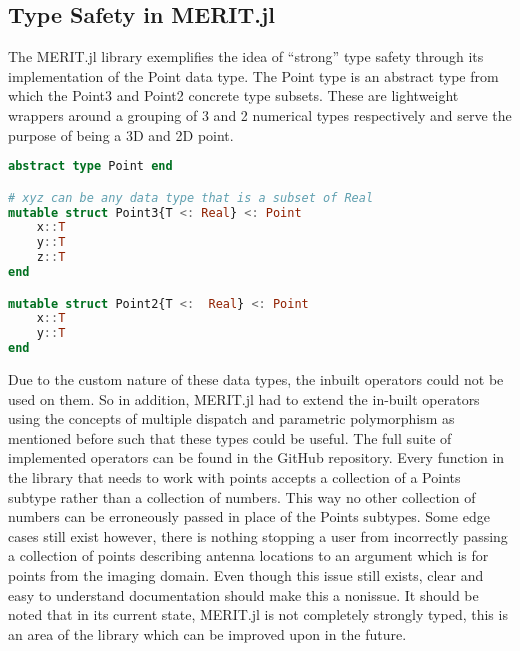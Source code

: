 \subsection{Type Safety in MERIT.jl}
The MERIT.jl library exemplifies the idea of ``strong'' type safety through its implementation of the Point data type.
The Point type is an abstract type from which the Point3 and Point2 concrete type subsets. These are lightweight
wrappers around a grouping of 3 and 2 numerical types respectively and serve the purpose of being a 3D and 2D point.
\begin{lstlisting}[language=Julia]
abstract type Point end

# xyz can be any data type that is a subset of Real
mutable struct Point3{T <: Real} <: Point
    x::T
    y::T
    z::T 
end

mutable struct Point2{T <:  Real} <: Point
    x::T
    y::T
end
\end{lstlisting}
Due to the custom nature of these data types, the inbuilt operators could not be used on them. So in addition, MERIT.jl
had to extend the in-built operators using the concepts of multiple dispatch and parametric polymorphism as mentioned
before such that these types could be useful. The full suite of implemented operators can be found in the GitHub
repository. Every function in the library that needs to work with points accepts a collection of a Points subtype
rather than a collection of numbers. This way no other collection of numbers can be erroneously passed in place of the
Points subtypes. Some edge cases still exist however, there is nothing stopping a user from incorrectly passing a
collection of points describing antenna locations to an argument which is for points from the imaging domain. Even
though this issue still exists, clear and easy to understand documentation should make this a nonissue. It should be
noted that in its current state, MERIT.jl is not completely strongly typed, this is an area of the library which can be
improved upon in the future. 
